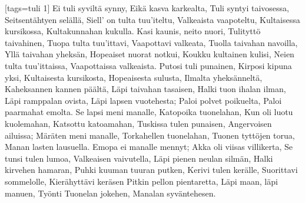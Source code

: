 [tags={tuli 1}]
  \beginverse
    Ei tuli syviltä synny,
    Eikä kasva karkealta,
    Tuli syntyi taivosessa,
    Seitsentähtyen selällä,
    Siell' on tulta tuu'iteltu,
    Valkeaista vaapoteltu,
    Kultaisessa kursikossa,
    Kultakunnahan kukulla.
  \endverse
  \beginverse
    Kasi kaunis, neito nuori,
    Tulityttö taivahinen,
    Tuopa tulta tuu'ittavi,
    Vaapottavi valkeata,
    Tuolla taivahan navoilla,
    Yllä taivahan yheksän,
    Hopeaiset nuorat notkui,
    Koukku kultainen kulisi,
    Neien tulta tuu'ittaissa,
    Vaapottaissa valkeaista.
  \endverse
  \beginverse
    Putosi tuli punainen,
    Kirposi kipuna yksi,
    Kultaisesta kursikosta,
    Hopeaisesta sulusta,
    Ilmalta yheksänneltä,
    Kaheksannen kannen päältä,
    Läpi taivahan tasaisen,
    Halki tuon ihalan ilman,
    Läpi ramppalan ovista,
    Läpi lapsen vuotehesta;
    Paloi polvet poikuelta,
    Paloi paarmahat emolta.
  \endverse
  \beginverse
    Se lapsi meni manalle,
    Katopoika tuonelahan,
    Kun oli luotu kuolemahan,
    Katsottu katoamahan,
    Tuskissa tulen punaisen,
    Angervoisen ailuissa;
    Märäten meni manalle,
    Torkahellen tuonelahan,
    Tuonen tyttöjen torua,
    Manan lasten lausuella.
  \endverse
  \beginverse
    Emopa ei manalle mennyt;
    Akka oli viisas villikerta,
    Se tunsi tulen lumoa,
    Valkeaisen vaivutella,
    Läpi pienen neulan silmän,
    Halki kirvehen hamaran,
    Puhki kuuman tuuran putken,
    Kerivi tulen kerälle,
    Suorittavi sommelolle,
    Kierähyttävi keräsen
    Pitkin pellon pientaretta,
    Läpi maan, läpi manuen,
    Työnti Tuonelan jokehen,
    Manalan syväntehesen.
  \endverse
\endsong

